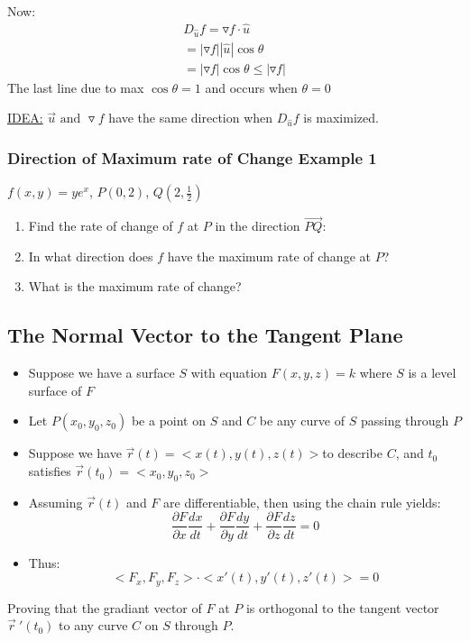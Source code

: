 \documentclass[12pt]{article}
\begin{document}
Now:
\begin{align*}
	D_{\hat{u}}f = \triangledown f \cdot \hat{u}\\
	= |\triangledown f| |\hat{u}| \cos{\theta}\\
	= |\triangledown f| \cos{\theta} \leq |\triangledown f|
\end{align*}
The last line due to max \(\cos{\theta} = 1\) and occurs when \(\theta = 0\)

\underline{IDEA:} \(\vec{u} \text{ and }\triangledown f\) have the same direction when \(D_{\hat{u}}f\) is maximized.

\subsubsection{Direction of Maximum rate of Change Example 1}
\(f(x,y) = ye^x\), \(P(0,2)\), \(Q(2,\frac{1}{2})\)
\begin{enumerate}
	\item Find the rate of change of \(f\) at \(P\) in the direction \(\vec{PQ} \):
	\item In what direction does \(f\) have the maximum rate of change at \(P\)?
	\item What is the maximum rate of change?
\end{enumerate}

\subsection{The Normal Vector to the Tangent Plane}
\begin{itemize}
	\item Suppose we have a surface \(S\) with equation \(F(x,y,z) = k\) where \(S\) is a level surface of \(F\)
	\item Let \(P(x_0,y_0,z_0)\) be a point on \(S\) and \(C\) be any curve of \(S\) passing through \(P\)
	\item Suppose we have \(\vec{r} (t) = <x(t),y(t),z(t)>\)to describe \(C\), and \(t_0\) satisfies \(\vec{r} (t_0) = <x_0,y_0,z_0>\)
	\item Assuming \(\vec{r} (t)\) and \(F\) are differentiable, then using the chain rule yields:
		\[
			\frac{\partial F}{\partial x} \frac{dx}{dt} + \frac{\partial F}{\partial y} \frac{dy}{dt} + \frac{\partial F}{\partial z} \frac{dz}{dt} = 0
		\]
	\item Thus: 
		\[
			<F_x, F_y, F_z> \cdot <x'(t), y'(t), z'(t)> = 0
		\]
\end{itemize}
Proving that the gradiant vector of \(F\) at \(P\) is orthogonal to the tangent vector \(\vec{r}\ '(t_0) \) to any curve \(C\) on \(S\) through \(P\).
\end{document}
